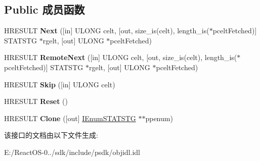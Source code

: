 \subsection*{Public 成员函数}
\begin{DoxyCompactItemize}
\item 
\mbox{\label{interface_i_enum_s_t_a_t_s_t_g_ad8c3dfafb2743ba129d15e38880341e5}} 
H\+R\+E\+S\+U\+LT {\bfseries Next} (\mbox{[}in\mbox{]} U\+L\+O\+NG celt, \mbox{[}out, size\+\_\+is(celt), length\+\_\+is($\ast$pcelt\+Fetched)\mbox{]} S\+T\+A\+T\+S\+TG $\ast$rgelt, \mbox{[}out\mbox{]} U\+L\+O\+NG $\ast$pcelt\+Fetched)
\item 
\mbox{\label{interface_i_enum_s_t_a_t_s_t_g_a2281ea0df6d501e9c01dde00e62cb0af}} 
H\+R\+E\+S\+U\+LT {\bfseries Remote\+Next} (\mbox{[}in\mbox{]} U\+L\+O\+NG celt, \mbox{[}out, size\+\_\+is(celt), length\+\_\+is($\ast$pcelt\+Fetched)\mbox{]} S\+T\+A\+T\+S\+TG $\ast$rgelt, \mbox{[}out\mbox{]} U\+L\+O\+NG $\ast$pcelt\+Fetched)
\item 
\mbox{\label{interface_i_enum_s_t_a_t_s_t_g_af851da60cf0b924d6f0058b35ec8414e}} 
H\+R\+E\+S\+U\+LT {\bfseries Skip} (\mbox{[}in\mbox{]} U\+L\+O\+NG celt)
\item 
\mbox{\label{interface_i_enum_s_t_a_t_s_t_g_a700e1000980a7b2a65afa4f9f40ee1d1}} 
H\+R\+E\+S\+U\+LT {\bfseries Reset} ()
\item 
\mbox{\label{interface_i_enum_s_t_a_t_s_t_g_af7b6b4f0c2b3539e841b6975156d3c1f}} 
H\+R\+E\+S\+U\+LT {\bfseries Clone} (\mbox{[}out\mbox{]} \hyperlink{interface_i_enum_s_t_a_t_s_t_g}{I\+Enum\+S\+T\+A\+T\+S\+TG} $\ast$$\ast$ppenum)
\end{DoxyCompactItemize}


该接口的文档由以下文件生成\+:\begin{DoxyCompactItemize}
\item 
E\+:/\+React\+O\+S-\/0../sdk/include/psdk/objidl.\+idl\end{DoxyCompactItemize}
